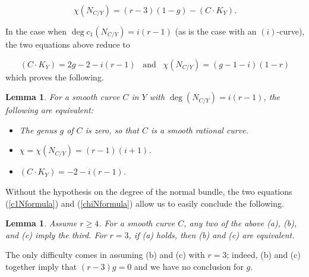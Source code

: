\documentclass[12pt]{article}
\newtheorem{lemma}[equation]{Lemma}
\numberwithin{equation}{section}
\numberwithin{subeq}{equation}
\begin{document}
\begin{equation}\label{chiNformula}
\chi(N_{C/Y}) = (r-3)(1-g) - (C \cdot K_Y).
\end{equation}

In the case when $\deg c_1(N_{C/Y}) = i(r-1)$
(as is the case with an $(i)$-curve),
the two equations above reduce to

\[
(C \cdot K_Y) = 2g-2 -i(r-1) \;\;\;\text{and}\;\;\; \chi(N_{C/Y}) = (g-1-i)(1-r)
\]
which proves the following.

\begin{lemma}\label{generalcurve} For a smooth curve $C$ in $Y$ with $\deg(N_{C/Y}) = i(r-1)$,
the following are equivalent:
\begin{itemize}
\item[(a)] The genus $g$ of $C$ is zero, so that $C$ is a smooth rational curve.
\item[(b)] $\chi = \chi(N_{C/Y}) = (r-1)(i+1)$.
\item[(c)] $(C\cdot K_Y) = -2-i(r-1)$.
\end{itemize}
\end{lemma}

Without the hypothesis on the degree of the normal bundle, the two equations
(\ref{c1Nformula}) and (\ref{chiNformula}) 
allow us to easily conclude the following.

\begin{lemma} Assume $r\geq 4$.  For a smooth curve $C$,
any two of the above (a), (b), and (c) imply the third.
For $r=3$, if (a) holds, then (b) and (c) are equivalent.
\end{lemma}

The only difficulty comes in assuming (b) and (c) with $r=3$;
indeed, (b) and (c) together imply that $(r-3)g=0$ and we have no conclusion for $g$.
\end{document}
